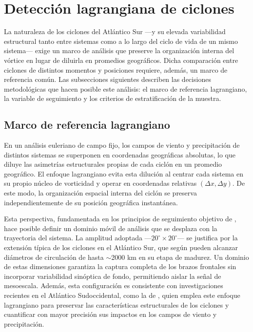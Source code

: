 \section{Detección lagrangiana de ciclones}\label{sec:tb_vorticidad}
La naturaleza de los ciclones del Atlántico Sur ---y su elevada variabilidad estructural tanto entre sistemas como a lo largo del ciclo de vida de un mismo sistema--- exige un marco de análisis que preserve la organización interna del vórtice en lugar de diluirla en promedios geográficos. Dicha comparación entre ciclones de distintos momentos y posiciones requiere, además, un marco de referencia común. Las subsecciones siguientes describen las decisiones metodológicas que hacen posible este análisis: el marco de referencia lagrangiano, la variable de seguimiento y los criterios de estratificación de la muestra.

\subsection{Marco de referencia lagrangiano}\label{subsec:tb_lagrangiano}
En un análisis euleriano de campo fijo, los campos de viento y precipitación de distintos sistemas se superponen en coordenadas geográficas absolutas, lo que diluye las asimetrías estructurales propias de cada ciclón en un promedio geográfico. El enfoque lagrangiano evita esta dilución al centrar cada sistema en su propio núcleo de vorticidad y operar en coordenadas relativas $(\Delta x, \Delta y)$. De este modo, la organización espacial interna del ciclón se preserva independientemente de su posición geográfica instantánea.

Esta perspectiva, fundamentada en los principios de seguimiento objetivo de \citet{sinclair1994objective}, hace posible definir un dominio móvil de análisis que se desplaza con la trayectoria del sistema. La amplitud adoptada ---$20^{\circ} \times 20^{\circ}$--- se justifica por la extensión típica de los ciclones en el Atlántico Sur, que según \citet{gramcianinov2020analysis} pueden alcanzar diámetros de circulación de hasta $\sim$2000 km en su etapa de madurez. Un dominio de estas dimensiones garantiza la captura completa de los brazos frontales sin incorporar variabilidad sinóptica de fondo, permitiendo aislar la señal de mesoescala. Además, esta configuración es consistente con investigaciones recientes en el Atlántico Sudoccidental, como la de \citet{cardoso2022synoptic}, quien emplea este enfoque lagrangiano para preservar las características estructurales de los ciclones y cuantificar con mayor precisión sus impactos en los campos de viento y precipitación.

